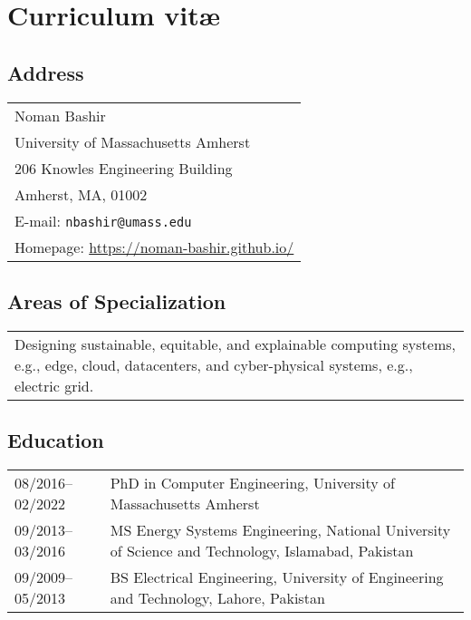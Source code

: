 \documentclass[11pt, a4paper, DIV=12]{scrartcl}
\begin{document}
\section*{\textcolor{upmaroon}{Curriculum vitæ}}
\vspace{-20pt}
\hrulefill
\subsection*{Address}
\noindent
\begin{tabular}{l}
Noman Bashir\\
University of Massachusetts Amherst\\ 
206 Knowles Engineering Building\\ 
Amherst, MA, 01002\\
E-mail: \texttt{nbashir@umass.edu} \\
Homepage: \url{https://noman-bashir.github.io/}\\
\end{tabular}

\subsection*{Areas of Specialization}
\noindent
\begin{tabular}{p{15.0cm}}
Designing sustainable, equitable, and explainable computing systems, e.g., edge, cloud, datacenters, and cyber-physical systems, e.g., electric grid.
\end{tabular}

\subsection*{Education}
\noindent
\begin{tabular}{p{3.0cm}p{11.5cm}}
	08/2016--02/2022&PhD in Computer Engineering, University of Massachusetts Amherst\\
	09/2013--03/2016&MS Energy Systems Engineering, National University of Science and Technology, Islamabad, Pakistan\\
	09/2009--05/2013&BS Electrical Engineering, University of Engineering and Technology, Lahore, Pakistan\\
\end{tabular}
\end{document}
